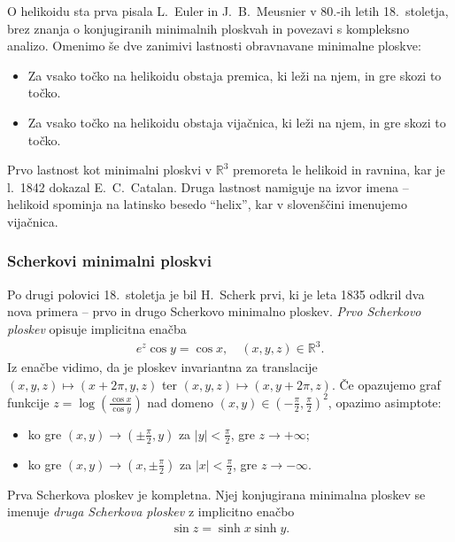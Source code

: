 \documentclass[12pt,a4paper,twoside]{article}
\theoremstyle{definition} %
\theoremstyle{plain} %
\numberwithin{equation}{section}  %
\newcommand{\R}{\mathbb R}
\begin{document}
O helikoidu sta prva pisala L.~Euler in J.~B.~Meusnier v 80.-ih letih 18.~stoletja, brez znanja o konjugiranih minimalnih ploskvah in povezavi s kompleksno analizo. Omenimo še dve zanimivi lastnosti obravnavane minimalne ploskve:
\begin{itemize}
\item Za vsako točko na helikoidu obstaja premica, ki leži na njem, in gre skozi to točko.
\item Za vsako točko na helikoidu obstaja vijačnica, ki leži na njem, in gre skozi to točko.
\end{itemize}
Prvo lastnost kot minimalni ploskvi v $\mathbb{R}^3$ premoreta le helikoid in ravnina, kar je l.~1842 dokazal E.~C.~Catalan. Druga lastnost namiguje na izvor imena -- helikoid spominja na latinsko besedo ``helix'', kar v slovenščini imenujemo vijačnica.

\subsubsection{Scherkovi minimalni ploskvi}
% 
Po drugi polovici 18.~stoletja je bil H.~Scherk prvi, ki je leta 1835 odkril dva nova primera -- prvo in drugo Scherkovo minimalno ploskev. 
\emph{Prvo Scherkovo ploskev} opisuje implicitna enačba
\begin{gather}
e^{z} \cos y = \cos x, \quad (x,y,z) \in \R^3.
\end{gather}
Iz enačbe vidimo, da je ploskev invariantna za translacije $(x,y,z) \mapsto (x+2\pi,y,z)$ ter $(x,y,z) \mapsto (x,y+2\pi,z)$.
Če opazujemo graf funkcije $z = \log \left(\frac{\cos x}{\cos y} \right)$ nad domeno $(x,y) \in \left( -\frac{\pi}{2}, \frac{\pi}{2} \right)^2$, opazimo asimptote:
\begin{itemize}
\item ko gre $(x,y) \to \left( \pm \frac{\pi}{2}, y \right)$ za $|y| < \frac{\pi}{2}$, gre $z \to +\infty$;
\item ko gre $(x,y) \to \left( x, \pm \frac{\pi}{2} \right)$ za $|x| < \frac{\pi}{2}$, gre $z \to -\infty$.
\end{itemize}
Prva Scherkova ploskev je kompletna. 
Njej konjugirana minimalna ploskev se imenuje \emph{druga Scherkova ploskev} z implicitno enačbo
\begin{gather}
\sin z = \sinh x \sinh y.
\end{gather}
\end{document}
